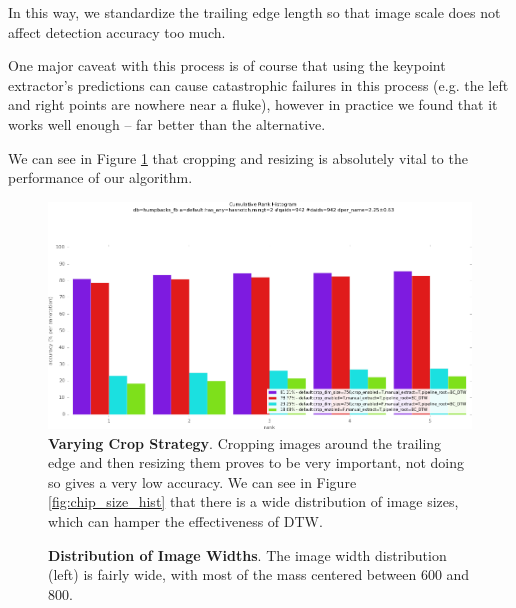 In this way, we standardize the trailing edge length so that image scale does not affect detection accuracy too much.

One major caveat with this process is of course that using the keypoint extractor's predictions can cause catastrophic failures in this process (e.g. the left and right points are nowhere near a fluke), however in practice we found that it works well enough -- far better than the alternative.

We can see in Figure \ref{fig:vary_crop_nocrop} that cropping and resizing is absolutely vital to the performance of our algorithm.

\begin{figure}[t]%
\centering
\includegraphics[width=1\textwidth]{../images/results/vary_crop_nocrop.png}
\caption[]{\textbf{Varying Crop Strategy}. Cropping images around the trailing edge and then resizing them proves to be very important, not doing so gives a very low accuracy. We can see in Figure \ref{fig:chip_size_hist} that there is a wide distribution of image sizes, which can hamper the effectiveness of DTW.}
\label{fig:vary_crop_nocrop}
\end{figure}

\begin{figure}[t]%
\centering
{}
\caption[]{\textbf{Distribution of Image Widths}. The image width distribution (left) is fairly wide, with most of the mass centered between 600 and 800.}
\label{fig:width_te_dist}
\end{figure}



